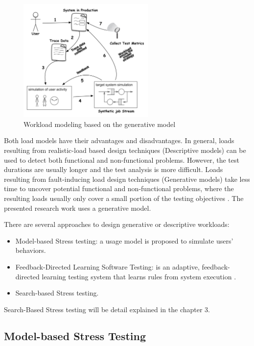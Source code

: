 \documentclass{report}
\begin{document}
\begin{figure}[h]
\centering
\includegraphics[width=0.6\textwidth]{./images/workloadmodel2300dpi.png}
\caption{Workload modeling based on the generative model \cite{DiLucca2006}}
\label{fig:generativemodel}

\end{figure}


Both load models have their advantages and disadvantages. In general, loads resulting from realistic-load based design techniques (Descriptive models) can be used to detect both functional and non-functional problems. However, the test durations are usually longer and the test analysis is more difficult. Loads resulting from fault-inducing load design techniques (Generative models) take less time to uncover potential functional and non-functional problems, where the resulting loads usually only cover a small portion of the testing objectives \cite{Jiang2010}. The presented research work uses a generative model.


There are  several approaches to design generative or descriptive workloads:

\begin{itemize}
\item Model-based Stress testing: a usage model is proposed to simulate users’ behaviors.
\item Feedback-Directed Learning Software Testing: is an adaptive, feedback-directed learning testing system that learns rules from system execution \cite{Luo2015} \cite{Wert2014}.
\item Search-based Stress testing. 
\end{itemize}


Search-Based Stress testing will be detail explained in the chapter 3.

\subsection{Model-based Stress Testing}
\end{document}
